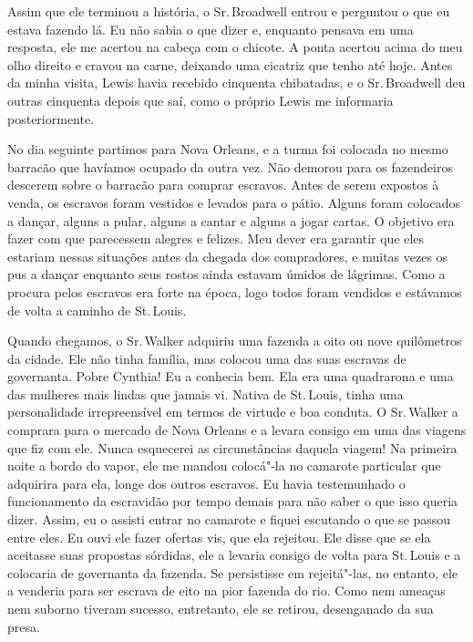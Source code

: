 Assim que ele terminou a história, o Sr.\,Broadwell entrou e perguntou o
que eu estava fazendo lá. Eu não sabia o que dizer e, enquanto pensava
em uma resposta, ele me acertou na cabeça com o chicote. A ponta acertou
acima do meu olho direito e cravou na carne, deixando uma cicatriz que
tenho até hoje. Antes da minha visita, Lewis havia recebido cinquenta
chibatadas, e o Sr.\,Broadwell deu outras cinquenta depois que saí, como
o próprio Lewis me informaria posteriormente.

No dia seguinte partimos para Nova Orleans, e a turma foi colocada no
mesmo barracão que havíamos ocupado da outra vez. Não demorou para os
fazendeiros descerem sobre o barracão para comprar escravos. Antes de
serem expostos à venda, os escravos foram vestidos e levados para o
pátio. Alguns foram colocados a dançar, alguns a pular, alguns a cantar \label{ref8}
e alguns a jogar cartas. O objetivo era fazer com que parecessem alegres 
e felizes. Meu dever era garantir que eles estariam nessas situações
antes da chegada dos compradores, e muitas vezes os pus a dançar
enquanto seus rostos ainda estavam úmidos de lágrimas. Como a procura
pelos escravos era forte na época, logo todos foram vendidos e estávamos
de volta a caminho de St.\,Louis.

Quando chegamos, o Sr.\,Walker adquiriu uma fazenda a oito ou nove
quilômetros da cidade. Ele não tinha família, mas colocou uma das suas
escravas de governanta. Pobre Cynthia! Eu a conhecia bem. Ela era uma
quadrarona e uma das mulheres mais lindas que jamais vi. Nativa de St.\,Louis, tinha uma personalidade irrepreensível em termos de virtude e boa
conduta. O Sr.\,Walker a comprara para o mercado de Nova Orleans e a
levara consigo em uma das viagens que fiz com ele. Nunca esquecerei as
circunstâncias daquela viagem! Na primeira noite a bordo do vapor, ele
me mandou colocá"-la no camarote particular que adquirira para ela, longe
dos outros escravos. Eu havia testemunhado o funcionamento da escravidão
por tempo demais para não saber o que isso queria dizer. Assim, eu o
assisti entrar no camarote e fiquei escutando o que se passou entre
eles. Eu ouvi ele fazer ofertas vis, que ela rejeitou. Ele disse que se
ela aceitasse suas propostas sórdidas, ele a levaria consigo de volta
para St.\,Louis e a colocaria de governanta da fazenda. Se persistisse em
rejeitá"-las, no entanto, ele a venderia para ser escrava de eito na pior
fazenda do rio. Como nem ameaças nem suborno tiveram sucesso,
entretanto, ele se retirou, desenganado da sua presa.

